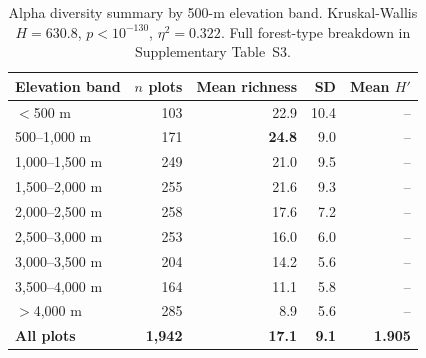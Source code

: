 \documentclass[review,12pt,a4paper]{elsarticle}
\begin{document}
\begin{table}[htbp]
\caption{Alpha diversity summary by 500-m elevation band.
Kruskal-Wallis $H = 630.8$, $p < 10^{-130}$, $\eta^2 = 0.322$.
Full forest-type breakdown in Supplementary Table~S3.}
\label{tab:alpha}
\centering
\begin{tabular}{lrrrr}
\toprule
Elevation band & $n$ plots & Mean richness & SD & Mean $H'$ \\
\midrule
$<$500 m        & 103 & 22.9 & 10.4 & -- \\
500--1{,}000 m  & 171 & \textbf{24.8} & 9.0  & -- \\
1{,}000--1{,}500 m & 249 & 21.0 & 9.5  & -- \\
1{,}500--2{,}000 m & 255 & 21.6 & 9.3  & -- \\
2{,}000--2{,}500 m & 258 & 17.6 & 7.2  & -- \\
2{,}500--3{,}000 m & 253 & 16.0 & 6.0  & -- \\
3{,}000--3{,}500 m & 204 & 14.2 & 5.6  & -- \\
3{,}500--4{,}000 m & 164 & 11.1 & 5.8  & -- \\
$>$4{,}000 m    & 285 &  8.9 & 5.6  & -- \\
\midrule
\textbf{All plots} & \textbf{1{,}942} & \textbf{17.1} & \textbf{9.1} & \textbf{1.905} \\
\bottomrule
\end{tabular}
\end{table}

\clearpage
\end{document}
